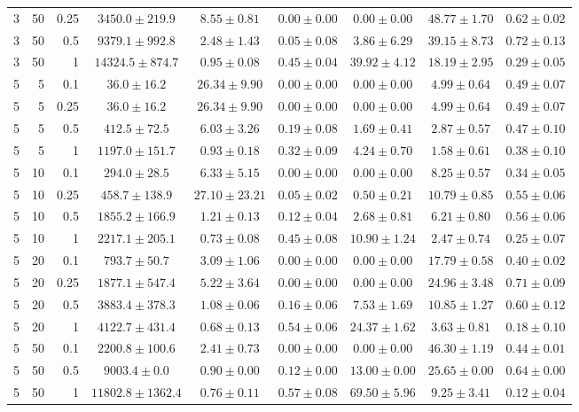 \begin{table}[htbp]
\begin{tabular}{@{}rrrcccccc@{}}
3 & 50 & 0.25 & $3450.0 \pm 219.9$ & $8.55 \pm 0.81$ & $0.00 \pm 0.00$ & $0.00 \pm 0.00$ & $48.77 \pm 1.70$ & $0.62 \pm 0.02$ \\
3 & 50 & 0.5 & $9379.1 \pm 992.8$ & $2.48 \pm 1.43$ & $0.05 \pm 0.08$ & $3.86 \pm 6.29$ & $39.15 \pm 8.73$ & $0.72 \pm 0.13$ \\
3 & 50 & 1 & $14324.5 \pm 874.7$ & $0.95 \pm 0.08$ & $0.45 \pm 0.04$ & $39.92 \pm 4.12$ & $18.19 \pm 2.95$ & $0.29 \pm 0.05$ \\
\midrule
5 & 5 & 0.1 & $36.0 \pm 16.2$ & $26.34 \pm 9.90$ & $0.00 \pm 0.00$ & $0.00 \pm 0.00$ & $4.99 \pm 0.64$ & $0.49 \pm 0.07$ \\
5 & 5 & 0.25 & $36.0 \pm 16.2$ & $26.34 \pm 9.90$ & $0.00 \pm 0.00$ & $0.00 \pm 0.00$ & $4.99 \pm 0.64$ & $0.49 \pm 0.07$ \\
5 & 5 & 0.5 & $412.5 \pm 72.5$ & $6.03 \pm 3.26$ & $0.19 \pm 0.08$ & $1.69 \pm 0.41$ & $2.87 \pm 0.57$ & $0.47 \pm 0.10$ \\
5 & 5 & 1 & $1197.0 \pm 151.7$ & $0.93 \pm 0.18$ & $0.32 \pm 0.09$ & $4.24 \pm 0.70$ & $1.58 \pm 0.61$ & $0.38 \pm 0.10$ \\
5 & 10 & 0.1 & $294.0 \pm 28.5$ & $6.33 \pm 5.15$ & $0.00 \pm 0.00$ & $0.00 \pm 0.00$ & $8.25 \pm 0.57$ & $0.34 \pm 0.05$ \\
5 & 10 & 0.25 & $458.7 \pm 138.9$ & $27.10 \pm 23.21$ & $0.05 \pm 0.02$ & $0.50 \pm 0.21$ & $10.79 \pm 0.85$ & $0.55 \pm 0.06$ \\
5 & 10 & 0.5 & $1855.2 \pm 166.9$ & $1.21 \pm 0.13$ & $0.12 \pm 0.04$ & $2.68 \pm 0.81$ & $6.21 \pm 0.80$ & $0.56 \pm 0.06$ \\
5 & 10 & 1 & $2217.1 \pm 205.1$ & $0.73 \pm 0.08$ & $0.45 \pm 0.08$ & $10.90 \pm 1.24$ & $2.47 \pm 0.74$ & $0.25 \pm 0.07$ \\
5 & 20 & 0.1 & $793.7 \pm 50.7$ & $3.09 \pm 1.06$ & $0.00 \pm 0.00$ & $0.00 \pm 0.00$ & $17.79 \pm 0.58$ & $0.40 \pm 0.02$ \\
5 & 20 & 0.25 & $1877.1 \pm 547.4$ & $5.22 \pm 3.64$ & $0.00 \pm 0.00$ & $0.00 \pm 0.00$ & $24.96 \pm 3.48$ & $0.71 \pm 0.09$ \\
5 & 20 & 0.5 & $3883.4 \pm 378.3$ & $1.08 \pm 0.06$ & $0.16 \pm 0.06$ & $7.53 \pm 1.69$ & $10.85 \pm 1.27$ & $0.60 \pm 0.12$ \\
5 & 20 & 1 & $4122.7 \pm 431.4$ & $0.68 \pm 0.13$ & $0.54 \pm 0.06$ & $24.37 \pm 1.62$ & $3.63 \pm 0.81$ & $0.18 \pm 0.10$ \\
5 & 50 & 0.1 & $2200.8 \pm 100.6$ & $2.41 \pm 0.73$ & $0.00 \pm 0.00$ & $0.00 \pm 0.00$ & $46.30 \pm 1.19$ & $0.44 \pm 0.01$ \\
5 & 50 & 0.5 & $9003.4 \pm 0.0$ & $0.90 \pm 0.00$ & $0.12 \pm 0.00$ & $13.00 \pm 0.00$ & $25.65 \pm 0.00$ & $0.64 \pm 0.00$ \\
5 & 50 & 1 & $11802.8 \pm 1362.4$ & $0.76 \pm 0.11$ & $0.57 \pm 0.08$ & $69.50 \pm 5.96$ & $9.25 \pm 3.41$ & $0.12 \pm 0.04$ \\
\bottomrule
\end{tabular}
\end{table}
